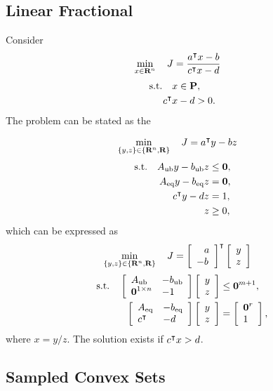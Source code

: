 \documentclass{article}
\begin{document}
    \subsection{Linear Fractional}

    Consider
    \begin{align*}
        \min_{x\in\textbf{R}^n} \quad J&=\frac{a^\intercal x - b}{c^\intercal x - d}
    \end{align*}
    \begin{align*}
        \text{s.t.}\quad x&\in\textbf{P},\\
        c^\intercal x& - d  > 0.
    \end{align*}
    The problem can be stated as the \LP \cite[p.~151]{bv_cvxbook}

    \begin{align*}
        \min_{\{y,z\}\in\{\textbf{R}^n,\textbf{R}\}}\quad J & = a^\intercal y - b z
    \end{align*}
    \begin{align*}
        \text{s.t.}\quad A_{\text{ub}} y-b_{\text{ub}} z&\leq \textbf{0},\\
        A_{\text{eq}} y-b_{\text{eq}} z&=\textbf{0},\\
        c^\intercal y - d z &=1,\\
        z&\geq 0,
    \end{align*}
    which can be expressed as
    \begin{align*}
        \min_{\{y,z\}\in\{\R^n,\R\}}\quad J & = \mat{\minus a \\ -b}^\tp \mat{y \\ z}
    \end{align*}
    \begin{align*}
        \text{s.t.}\quad \left[\begin{array}{lllllllllllllllllll}A_{\text{ub}} & -b_{\text{ub}} \\ \textbf{0}^{1\times n} & -1 \end{array}\right]\left[\begin{array}{lllllllllllllllllll}y\\z\end{array}\right]&
        \leq \textbf{0}^{m+1},\\
        \left[\begin{array}{lllllllllllllllllll} A_{\text{eq}} & -b_{\text{eq}} \\
        c^\intercal & - d 
        \end{array}\right]\left[\begin{array}{lllllllllllllllllll}y \\z\end{array}\right]&=\left[\begin{array}{lllllllllllllllllll}\textbf{0}^r \\ 1 \end{array}\right],
    \end{align*}
    where $x=y/z$.  The solution exists if $c^\intercal x>d$.\\

\subsection{Sampled Convex Sets}
\end{document}
